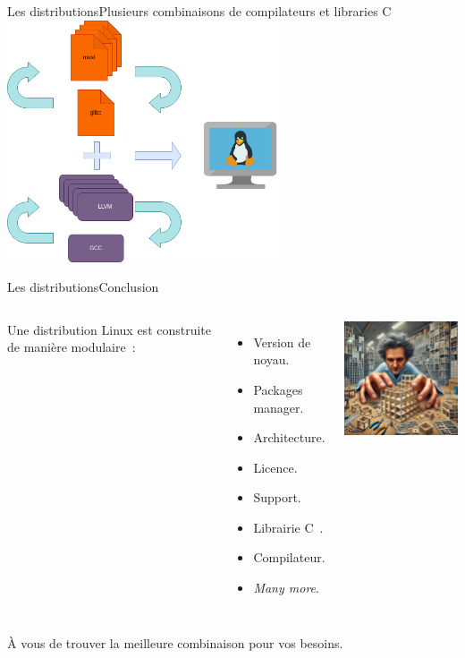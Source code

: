 \documentclass{beamer}
\begin{document}
    \begin{frame}{Les distributions}{Plusieurs combinaisons de compilateurs et libraries C}
        \centering
        \includegraphics[width=8cm]{image/interchange-lib-compiler.drawio}
    \end{frame}

    \begin{frame}{Les distributions}{Conclusion}
        \begin{columns}
            Une distribution Linux est construite de manière modulaire~:
            \begin{itemize}
                \item Version de noyau.
                \item Packages manager.
                \item Architecture.
                \item Licence.
                \item Support.
                \item Librairie C~.
                \item Compilateur.
                \item \textit{Many more}.
            \end{itemize}
            \centering
            \includegraphics[width=5.5cm]{image/craftsman-focused}
        \end{columns}
        \bigbreak
        À vous de trouver la meilleure combinaison pour vos besoins.
    \end{frame}
\end{document}
